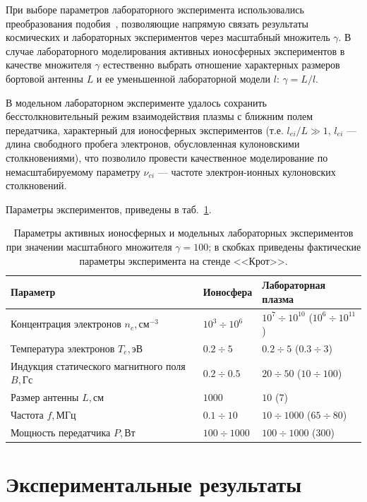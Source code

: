 \documentclass[autoref,10pt]{disser}
\begin{document}
При выборе параметров лабораторного эксперимента использовались преобразования подобия~\cite{Alfven}, позволяющие напрямую связать результаты космических и лабораторных экспериментов через масштабный множитель $\gamma$. В случае лабораторного моделирования активных ионосферных экспериментов в качестве множителя $\gamma$ естественно выбрать отношение характерных размеров бортовой антенны $L$ и ее уменьшенной лабораторной модели $l$: $\gamma{}=L/l$. 

В модельном лабораторном эксперименте удалось сохранить бесстолкновительный режим взаимодействия плазмы с ближним полем передатчика, характерный для ионосферных экспериментов (т.е. $l_{ei}/L\gg{}1$, $l_{ei}$ --- длина свободного пробега электронов, обусловленная кулоновскими столкновениями), что позволило провести качественное моделирование по немасштабируемому параметру $\nu_{ei}$ --- частоте электрон-ионных кулоновских столкновений.

Параметры экспериментов, приведены в \mbox{таб.~\ref{tab:value_scaling_ionosphere}}.
\begin{table}[H]
{
   \hfill{}
   \small
   \centering %
   \begin{tabular}{|m{3cm}|m{2.3cm}|m{4.5cm}|}
     \hline
     \textbf{Параметр} & \textbf{Ионосфера} & \textbf{Лабораторная плазма}\\\hline
     Концентрация электронов $n_{e}$,\,см$^{-3}$ & $10^{3}\div{}10^{6}$ & $10^{7}\div{}10^{10}$ ($10^{6}\div{}10^{11}$)\\\hline
     Температура электронов $T_{e}$,\,эВ & $0.2\div5$ & $0.2\div5$ ($0.3\div3$)\\\hline
     Индукция статического магнитного поля $B$,\,Гс & $0.2\div0.5$ & $20\div50$ ($10\div100$)\\\hline
     Размер антенны $L$,\,см & $1000$ & $10$ ($7$)\\\hline
     Частота $f$,\,МГц &$0.1\div10$& $10\div{}1000$ ($65\div 80$)\\\hline
     Мощность передатчика $P$,\,Вт &$100\div1000$& $100\div1000$ ($300$)\\\hline
   \end{tabular}
   \hfill{}
}
\caption{Параметры активных ионосферных и модельных лабораторных экспериментов при значении масштабного множителя $\gamma = 100$; в скобках приведены фактические параметры эксперимента на стенде <<Крот>>.}
   \label{tab:value_scaling_ionosphere}
\end{table}
\section{Экспериментальные результаты}
\end{document}
